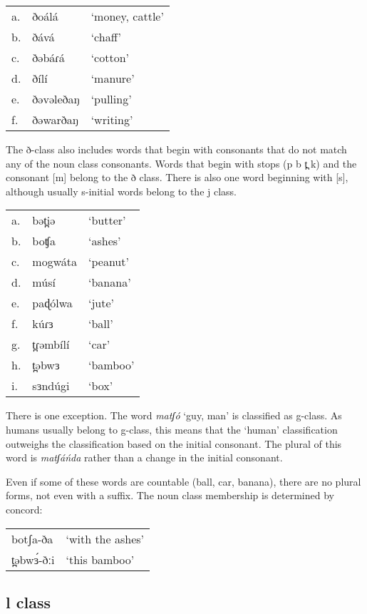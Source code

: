\ea
\begin{tabular}[t]{lll}
a.	&	ðoálá	&	‘money, cattle’\\
b.	&	ðává	&	‘chaff’\\
c.	&	ðəbáɾá	&	‘cotton’\\
d.	&	ðílí	&	‘manure’\\
e.	&	ðəvəleðaŋ&		‘pulling’\\
f.	&	ðəwarðaŋ	&	‘writing’\\
\end{tabular}
\z

The ð-class also includes words that begin with consonants that do not match any of the noun class consonants. Words that begin with stops (p b t̪ k) and the consonant [m] belong to the ð class. There is also one word beginning with [s], although usually s-initial words belong to the j class. 

\ea	
\begin{tabular}[t]{lll}
a.	&	bət̪iə		&	‘butter’\\
b.	&	boʧa		&	‘ashes’\\
c.	&	mogwáta		&	‘peanut’\\
d.	&	músí		&	‘banana’\\
e.	&	paɖólwa		&	‘jute’\\
f.	&	kúɾɜ		&	‘ball’\\
g.	&	t̪ɾəmbílí	&	‘car’\\
h.	&	t̪əbwɜ		&	‘bamboo’\\
i.	&	sɜndúgi		&	‘box’\\	
\end{tabular}

\z

There is one exception. The word \textit{matʃó} ‘guy, man’ is classified as g-class. As humans usually belong to g-class, this means that the ‘human’ classification outweighs the classification based on the initial consonant. The plural of this word is \textit{matʃáńda} rather than a change in the initial consonant. 

Even if some of these words are countable (ball, car, banana), there are no plural forms, not even with a suffix. The noun class membership is determined by concord:

\ea
\begin{tabular}[t]{ll}
	botʃa-ða	&	‘with the ashes’\\
	t̪əbwɜ́-ðːi	&	‘this bamboo’\\
\end{tabular}
\z


\subsection{l class}

